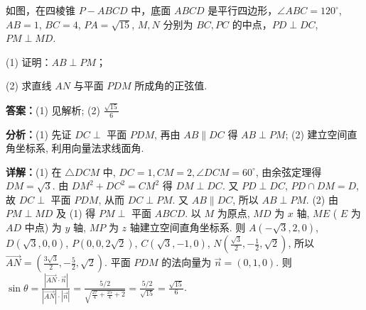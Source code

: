 \begin{question}[points=15]
如图，在四棱锥 $P-ABCD$ 中，底面 $ABCD$ 是平行四边形，$\angle ABC=120^\circ$, $AB=1$, $BC=4$, $PA=\sqrt{15}$, $M,N$ 分别为 $BC, PC$ 的中点，$PD\perp DC$, $PM\perp MD$.

(1) 证明：$AB\perp PM$；

(2) 求直线 $AN$ 与平面 $PDM$ 所成角的正弦值.
\begin{solution}
\textbf{答案：}(1) 见解析; (2) $\frac{\sqrt{15}}{6}$

\textbf{分析：}(1) 先证 $DC\perp$ 平面 $PDM$, 再由 $AB\parallel DC$ 得 $AB\perp PM$; (2) 建立空间直角坐标系, 利用向量法求线面角.

\textbf{详解：}(1) 在 $\triangle DCM$ 中, $DC=1,CM=2,\angle DCM=60^\circ$, 由余弦定理得 $DM=\sqrt{3}$. 由 $DM^2+DC^2=CM^2$ 得 $DM\perp DC$. 又 $PD\perp DC$, $PD\cap DM=D$, 故 $DC\perp$ 平面 $PDM$, 从而 $DC\perp PM$. 又 $AB\parallel DC$, 所以 $AB\perp PM$.
(2) 由 $PM\perp MD$ 及 (1) 得 $PM\perp$ 平面 $ABCD$. 以 $M$ 为原点, $MD$ 为 $x$ 轴, $ME$ ( $E$ 为 $AD$ 中点) 为 $y$ 轴, $MP$ 为 $z$ 轴建立空间直角坐标系. 则 $A(-\sqrt{3},2,0)$, $D(\sqrt{3},0,0)$, $P(0,0,2\sqrt{2})$, $C(\sqrt{3},-1,0)$, $N(\frac{\sqrt{3}}{2},-\frac12,\sqrt{2})$, 所以 $\overrightarrow{AN}=(\frac{3\sqrt{3}}{2},-\frac52,\sqrt{2})$. 平面 $PDM$ 的法向量为 $\vec{n}=(0,1,0)$. 则 $\sin\theta = \frac{|\overrightarrow{AN}\cdot\vec{n}|}{|\overrightarrow{AN}|\cdot|\vec{n}|} = \frac{5/2}{\sqrt{\frac{27}{4}+\frac{25}{4}+2}} = \frac{5/2}{\sqrt{15}} = \frac{\sqrt{15}}{6}$.
\end{solution}
\end{question}

